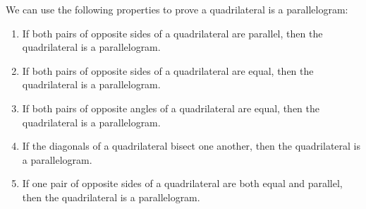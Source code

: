 We can use the following properties to prove a quadrilateral is a parallelogram:
\begin{enumerate}[label=\textbf{\arabic*}.]
 \item If both pairs of opposite sides of a quadrilateral are parallel, then the quadrilateral is a parallelogram.
 \item If both pairs of opposite sides of a quadrilateral are equal, then the quadrilateral is a parallelogram.
 \item If both pairs of opposite angles of a quadrilateral are equal, then the quadrilateral is a parallelogram.
 \item If the diagonals of a quadrilateral bisect one another, then the quadrilateral is a parallelogram.
 \item If one pair of opposite sides of a quadrilateral are both equal and parallel, then the quadrilateral is a parallelogram.
\end{enumerate}

